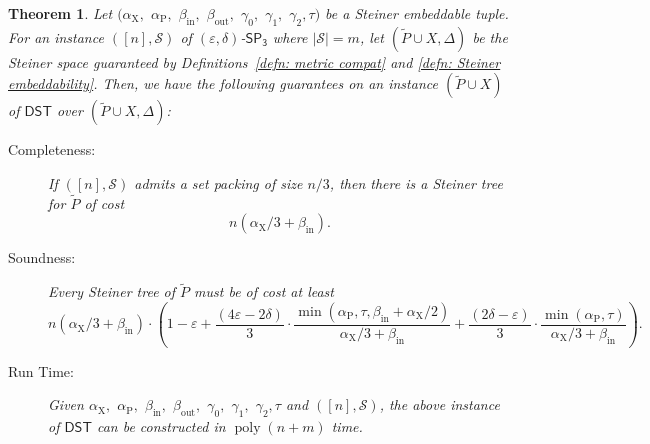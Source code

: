 \documentclass{article}\providecommand{\DeclareRedundantLanguages}[2]{}\usepackage[a4paper,margin=20mm]{geometry}
\newtheorem{theorem}{Theorem}\newtheorem{lemma}[theorem]{Lemma}\newtheorem{proposition}[theorem]{Proposition}\newtheorem{corollary}[theorem]{Corollary}\newtheorem{definition}[theorem]{Definition}\newtheorem{claim}[theorem]{Claim}\newtheorem{remark}[theorem]{Remark}\newtheorem{observation}[theorem]{Observation}\newtheorem{conjecture}[theorem]{Conjecture}\newtheorem{example}[theorem]{Example}
\DeclareMathOperator{\poly}{poly}
\newcommand{\1}{\textbf{1}}
\newcommand{\setpT}{$\mathsf{SP_3}$\xspace}
\newcommand{\dst}{$\mathsf{DST}$\xspace}
\newcommand{\td}{\tau}
\newcommand{\srd}{\alpha_{\text{X}}}
\newcommand{\trd}{\alpha_{\text{P}}}
\renewcommand{\tilde}{\widetilde}
\begin{document}
\begin{theorem} \label{thm: graph hardness}
Let $(\srd,$ $\trd,$ $\beta_{\text{in}},$ $\beta_{\text{out}},$ $\gamma_0,$ $\gamma_1,$ $\gamma_2,\td)$ be a Steiner embeddable tuple.
For an instance  $([n],\mathcal{S})$ of $(\varepsilon,\delta)$-\setpT where $|\mathcal{S}|=m$, let $(\tilde{P}\cup X,\Delta)$ be the Steiner space guaranteed by Definitions~\ref{defn: metric compat} and \ref{defn: Steiner embeddability}. Then,  we have the following guarantees on an instance $(\tilde{P} \cup X)$ of \dst over $(\tilde{P}\cup X,\Delta)$:
\begin{description}
        \item[Completeness:] If $([n],\mathcal{S})$ admits a set packing of size $n/3$, then there is a Steiner tree for $\tilde{P}$ of cost $$n(\srd/3+\beta_{\text{in}}).$$
        \item[Soundness:] Every Steiner tree of $\tilde{P}$ must be of cost at least
        $$n(\srd/3+\beta_{\text{in}})\cdot \left(1 - \varepsilon  + \frac{(4\varepsilon  - 2\delta)}{3} \cdot \frac{\min(\trd, \td, \beta_{\text{in}} + \srd/2)}{\srd/3+\beta_{\text{in}}} + \frac{(2\delta  - \varepsilon)}{3} \cdot \frac{\min(\trd, \td)}{\srd/3+\beta_{\text{in}}} \right).$$
        
        
        \item[Run Time:] Given $\srd,$ $\trd,$ $\beta_{\text{in}},$ $\beta_{\text{out}},$ $\gamma_0,$ $\gamma_1,$ $\gamma_2,\td$ and $([n],\mathcal{S})$, the above instance of \dst can be constructed in $\poly(n+m)$ time. 
        \end{description}
\end{theorem}
\end{document}
